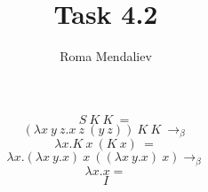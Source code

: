 \documentclass[12pt]{article}
\title{Task 4.2}
\author{Roma Mendaliev}
\date{}
\begin{document}
\maketitle

$$S\ K\ K\ =$$
$$(\lambda x\ y\ z.x\ z\ (y\ z))\ K\ K\ \rightarrow_\beta$$
$$\lambda x.K\ x\ (K\ x)\ =$$
$$\lambda x.(\lambda x\ y.x)\ x\ ((\lambda x\ y.x)\ x) \rightarrow_\beta$$
$$\lambda x.x =$$
$$I$$
\end{document}

